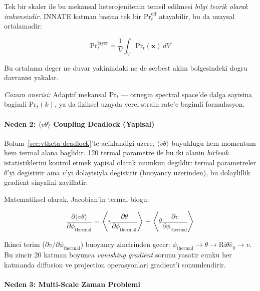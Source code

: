 Tek bir skaler ile bu mekansal heterojenitenin temsil edilmesi \emph{bilgi
teorik olarak imkansizdir}. INNATE katman basina tek bir
$\text{Pr}_t^\text{eff}$ atayabilir, bu da uzaysal ortalamadir:

\begin{equation}
  \text{Pr}_t^\text{layer} = \frac{1}{V}\int_V \text{Pr}_t(\mathbf{x})\,dV
  \label{eq:prt-average}
\end{equation}

Bu ortalama deger ne duvar yakinindaki ne de serbest akim bolgesindeki
dogru davranisi yakalar.

\emph{Cozum onerisi:} Adaptif mekansal $\text{Pr}_t$ --- ornegin spectral
space'de dalga sayisina bagimli $\text{Pr}_t(k)$, ya da fiziksel uzayda
yerel strain rate'e bagimli formulasyon.


\paragraph{Neden 2: $\langle v\theta \rangle$ Coupling Deadlock (Yapisal)}

Bolum~\ref{sec:vtheta-deadlock}'te aciklandigi uzere, $\langle v\theta \rangle$
buyuklugu hem momentum hem termal alana baglidir. 120 termal parametre ile
bu iki alanin \emph{birlesik} istatistiklerini kontrol etmek yapisal olarak
mumkun degildir: termal parametreler $\theta$'yi degistirir ama $v$'yi
dolayisiyla degistirir (buoyancy uzerinden), bu dolaylillik gradient sinyalini
zayiflatir.

Matematiksel olarak, Jacobian'in termal blogu:

\begin{equation}
  \frac{\partial \langle v\theta \rangle}{\partial \phi_\text{thermal}}
  = \left\langle v \frac{\partial \theta}{\partial \phi_\text{thermal}} \right\rangle
  + \left\langle \theta \frac{\partial v}{\partial \phi_\text{thermal}} \right\rangle
  \label{eq:vtheta-jacobian}
\end{equation}

\noindent Ikinci terim ($\partial v / \partial \phi_\text{thermal}$) buoyancy
zincirinden gecer: $\phi_\text{thermal} \to \theta \to \text{Ri}\theta\hat{e}_y
\to v$. Bu zincir 20 katman boyunca \emph{vanishing gradient} sorunu yasatir
cunku her katmanda diffusion ve projection operasyonlari gradient'i
sonumlendirir.


\paragraph{Neden 3: Multi-Scale Zaman Problemi}

